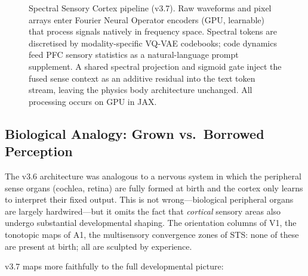 \begin{figure}[t]
{
}%
\caption{%
Spectral Sensory Cortex pipeline (v3.7).
Raw waveforms and pixel arrays enter Fourier Neural Operator encoders (GPU, learnable)
that process signals natively in frequency space.
Spectral tokens are discretised by modality-specific VQ-VAE codebooks; code dynamics
feed PFC sensory statistics as a natural-language prompt supplement.
A shared spectral projection and sigmoid gate inject the fused sense context as an
additive residual into the text token stream, leaving the physics body architecture
unchanged.
All processing occurs on GPU in JAX.
}
\label{fig:senses_v37}
\end{figure}

\subsection{Biological Analogy: Grown vs.\ Borrowed Perception}
\label{sec:grown_perception}

The v3.6 architecture was analogous to a nervous system in which the peripheral
sense organs (cochlea, retina) are fully formed at birth and the cortex only
learns to interpret their fixed output.
This is not wrong---biological peripheral organs are largely hardwired---but it omits
the fact that \emph{cortical} sensory areas also undergo substantial developmental
shaping.
The orientation columns of V1, the tonotopic maps of A1, the multisensory convergence
zones of STS: none of these are present at birth; all are sculpted by experience.

v3.7 maps more faithfully to the full developmental picture:

